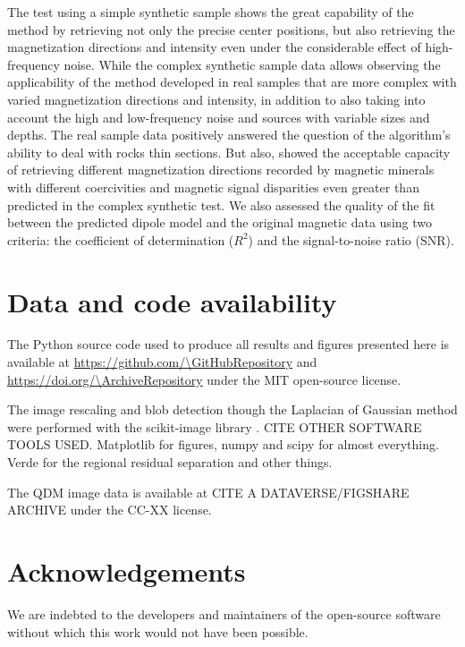The test using a simple synthetic sample shows the great capability of the method by retrieving not only the precise center positions, but also retrieving the magnetization directions and intensity even under the considerable effect of high-frequency noise. While the complex synthetic sample data allows observing the applicability of the method developed in real samples that are more complex with varied magnetization directions and intensity, in addition to also taking into account the high and low-frequency noise and sources with variable sizes and depths. The real sample data positively answered the question of the algorithm's ability to deal with rocks thin sections. But also, showed the acceptable capacity of retrieving different magnetization directions recorded by magnetic minerals with different coercivities and magnetic signal disparities even greater than predicted in the complex synthetic test. We also assessed the quality of the fit between the predicted dipole model and the original magnetic data using two criteria: the coefficient of determination ($R^2$) and the signal-to-noise ratio (SNR).


\section{Data and code availability}

The Python source code used to produce all results and figures presented here
is available at \url{https://github.com/\GitHubRepository} and
\url{https://doi.org/\ArchiveRepository} under the MIT open-source license.

The image rescaling and blob detection though the Laplacian of Gaussian method
were performed with the scikit-image library \citep{VanderWalt2014}. CITE OTHER
SOFTWARE TOOLS USED. Matplotlib for figures, numpy and scipy for almost
everything. Verde for the regional residual separation and other things.

The QDM image data is available at CITE A DATAVERSE/FIGSHARE ARCHIVE under the
CC-XX license.


\section{Acknowledgements}

We are indebted to the developers and maintainers of the open-source software
without which this work would not have been possible.
